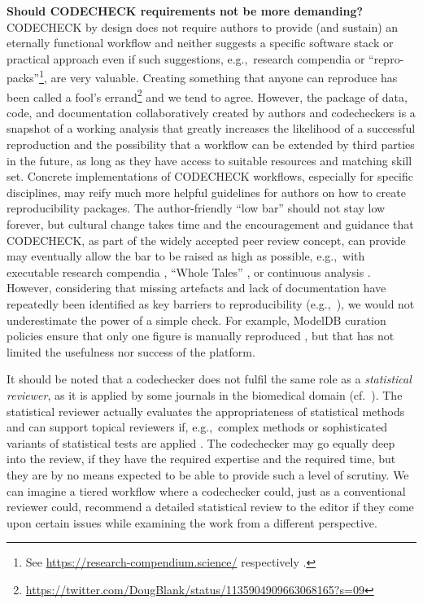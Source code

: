\documentclass[12pt]{article}
\begin{document}
\textbf{Should CODECHECK requirements not be more demanding?} \\
CODECHECK by design does not require authors to provide (and sustain) an
eternally functional workflow and neither suggests a specific software stack
or practical approach even if such suggestions, e.g.,~research compendia or ``repro-packs''\footnote{See \url{https://research-compendium.science/} respectively \cite{barba_praxis_2018}.}, are very valuable.
Creating something that anyone can reproduce has been called a 
fool's errand\footnote{\url{https://twitter.com/DougBlank/status/1135904909663068165?s=09}}
and we tend to agree.
However, the package of data, code, and documentation
collaboratively created by authors and codecheckers is a snapshot of a 
working analysis that greatly increases the likelihood of a successful 
reproduction and the possibility that a workflow can be extended by third parties in the future, as long as they have access
to suitable resources and matching skill set.
Concrete implementations of CODECHECK workflows, especially for specific
disciplines, may reify much more helpful guidelines for authors on how to
create reproducibility packages.
The author-friendly ``low bar'' should not stay low forever, but cultural
change takes time and the encouragement and guidance that CODECHECK,
as part of the widely accepted peer review concept, can provide may
eventually allow the bar to be raised as high as possible, e.g.,~with
executable research compendia \cite{nust_opening_2017}, ``Whole Tales'' \cite{brinckman_computing_2018},
or continuous analysis \cite{beaulieu-jones_reproducibility_2017-1}.
However, considering that missing artefacts and lack of documentation
have repeatedly been identified as key barriers to reproducibility
(e.g.,~\cite{stagge_assessing_2019,nust_improving_2020}),
we would not underestimate the power of a simple check.
For example, ModelDB curation policies ensure that only one figure is manually reproduced \cite{mcdougal_reproducibility_2016}, but that has not limited the usefulness nor success of the platform.

It should be noted that a codechecker does not fulfil the same role as a
\emph{statistical reviewer}, as it is applied by some journals in the 
biomedical domain (cf.~\cite{petrovecki_role_2009,greenwood_how_2015}).
The statistical reviewer actually evaluates the appropriateness of
statistical methods \cite{greenwood_how_2015} and can support topical
reviewers if, e.g.,~complex methods or sophisticated variants of statistical
tests are applied \cite{petrovecki_role_2009}.
The codechecker may go equally deep into the review, if they have
the required expertise and the required time, 
but they are by no means expected to be able to provide
such a level of scrutiny. We can imagine a tiered workflow where a 
codechecker could, just as a conventional reviewer could, recommend a detailed
statistical review to the editor if they come upon certain issues while
examining the work from a different perspective.
\end{document}
